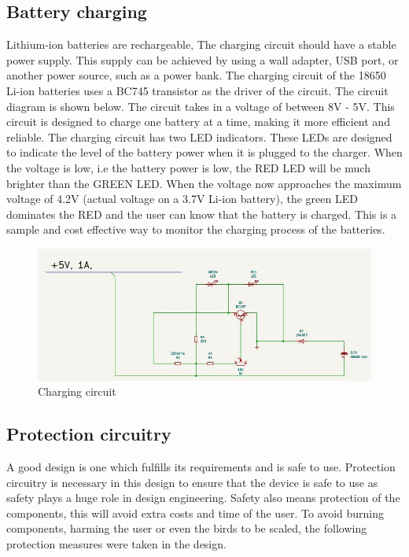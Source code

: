 \documentclass[class=report,11pt,crop=false]{standalone}
\begin{document}
	\subsection{Battery charging}
	Lithium-ion batteries are rechargeable,  The charging circuit should have a stable power supply. This supply can be achieved  by using a wall adapter, USB port, or another power source, such as a power bank. The charging circuit of the 18650 Li-ion batteries uses a BC745 transistor as the driver of the circuit. The circuit diagram is shown below. The circuit takes in a voltage of between 8V - 5V. This circuit is designed to charge one battery at a time, making it more efficient and reliable. The charging circuit has two LED indicators. These LEDs are designed to indicate the level of the battery power when it is plugged to the charger. When the voltage is low, i.e the battery power is low, the RED LED will be much brighter than the GREEN LED. When the voltage now approaches the maximum voltage of 4.2V (actual voltage on a 3.7V Li-ion battery), the green LED dominates the RED and the user can know that the battery is charged. This is a sample and cost effective way to monitor the charging process of the batteries.
	\begin{figure}[h!]
		\centering
		\includegraphics[width=0.8\linewidth]{Figures/Charging.jpg}
		\caption{Charging circuit}
		\label{fig:P2}
	\end{figure}
	\vspace{0.5cm}
	
	
	\subsection{Protection circuitry}
	
	A good design is one which fulfills its requirements and is safe to use. Protection circuitry is necessary in this design to ensure that the device is safe to use as safety plays a huge role in design engineering. Safety also means protection of the components, this will avoid extra costs and time of the user. To avoid burning components, harming the user or even the birds to be scaled, the following protection measures were taken in the design.
	\vspace{0.5cm}
	
\end{document}
